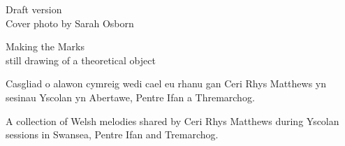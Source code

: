 \newpage

\noindent
\begin{minipage}[b][\textheight]{0.3\textwidth}
    \strut
    Draft version
    \\
    Cover photo by Sarah Osborn
\end{minipage}%
\hfill
\begin{minipage}[b][\textheight]{0.7\textwidth}
    \Huge{Making the Marks} \\
    \large{still drawing of a theoretical object}\\

    \begin{minipage}[b]{0.5\textwidth}
        \strut
        \normalsize{
          \noindent Casgliad o alawon cymreig wedi cael eu rhanu gan Ceri Rhys Matthews
          yn sesinau Yscolan yn Abertawe, Pentre Ifan a Thremarchog.
        }
    \end{minipage}%
    \begin{minipage}[b]{0.5\textwidth}
        \normalsize{
          \noindent A collection of Welsh melodies shared by Ceri Rhys Matthews
          during Yscolan sessions in Swansea, Pentre Ifan and Tremarchog.
        }
    \end{minipage}
\end{minipage}
